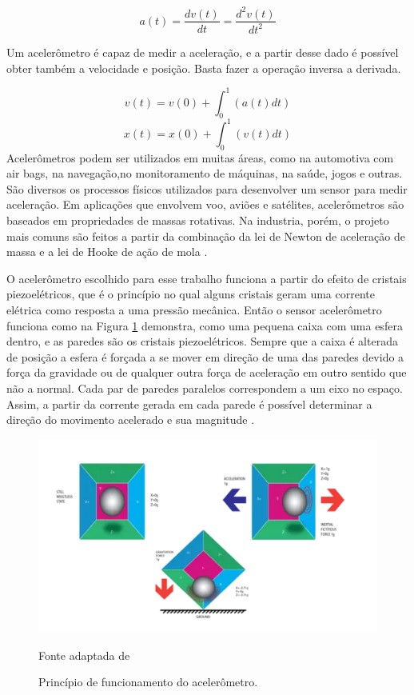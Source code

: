 \begin{equation}
a(t) = \frac{dv(t)}{dt} = \frac{d^2v(t)}{dt^2} 
\end{equation}

Um acelerômetro é capaz de medir a aceleração, e a partir desse dado é possível obter também a velocidade e posição. Basta fazer a operação inversa a derivada\cite{moyses2013}.

\begin{equation}
v(t) = v(0) + \int_{0}^{1}(a(t)dt)
\end{equation}
\begin{equation}
x(t) = x(0) + \int_{0}^{1}(v(t)dt)
\end{equation}
Acelerômetros podem ser utilizados em muitas áreas, como na  automotiva com air bags, na navegação,no monitoramento de máquinas, na saúde, jogos e outras. São diversos os processos físicos utilizados para desenvolver um sensor para
medir aceleração. Em aplicações que envolvem voo, aviões e satélites,
acelerômetros são baseados em propriedades de massas rotativas. Na industria,
porém, o projeto mais comuns são feitos a partir da combinação da lei de Newton de
aceleração de massa e a lei de Hooke de ação de mola \cite{carneiro2003}.

O acelerômetro escolhido para esse trabalho funciona a partir do efeito de cristais piezoelétricos, que é o princípio no qual alguns cristais geram uma corrente elétrica como resposta a uma pressão mecânica. Então o sensor acelerômetro  funciona como na Figura \ref{acel} demonstra, como uma pequena caixa com uma esfera dentro, e as paredes são os cristais piezoelétricos.  Sempre que a caixa é alterada de posição a esfera é forçada a se mover em direção de uma das paredes devido a força da gravidade ou de qualquer outra força de aceleração em outro sentido que não a normal. Cada par de paredes paralelos correspondem a um eixo no espaço. Assim, a partir da corrente gerada em cada parede é possível determinar a direção do movimento acelerado e sua magnitude \cite{Sanjeev2018}.

\begin{figure}[h]
	\centering
	\includegraphics[keepaspectratio=true,scale=0.8
	]{figuras/acelerometro.png}
	\caption{Princípio de funcionamento do acelerômetro.}
	Fonte adaptada de \cite{Sanjeev2018}
	\label{acel}
	
\end{figure}

